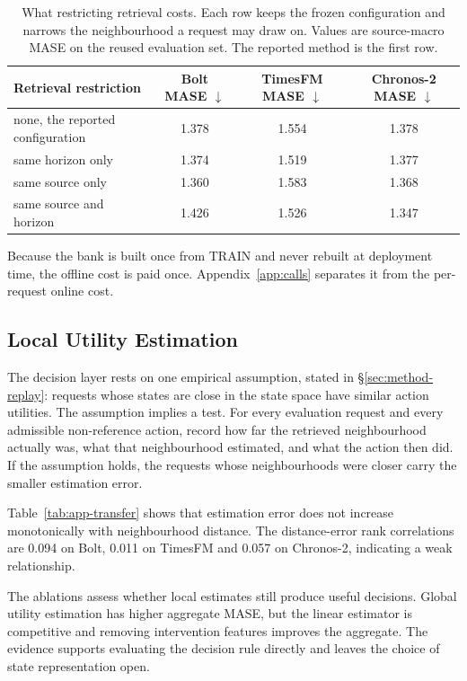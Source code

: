 \documentclass{article}
\begin{document}
\begin{table}[htbp]
  \caption{What restricting retrieval costs. Each row keeps the frozen configuration and
  narrows the neighbourhood a request may draw on. Values are source-macro MASE on the
  reused evaluation set. The reported method is the first row.}
  \label{tab:app-retrieval}
  \centering
  \small
  \setlength{\tabcolsep}{4pt}
\begin{tabular}{lccc}
    \toprule
    Retrieval restriction & Bolt MASE $\downarrow$ & TimesFM MASE $\downarrow$ & Chronos-2 MASE $\downarrow$ \\
    \midrule
    none, the reported configuration & 1.378 & 1.554 & 1.378 \\
    same horizon only                & 1.374   & 1.519   & 1.377 \\
    same source only                 & 1.360  & 1.583  & 1.368 \\
    same source and horizon          & 1.426 & 1.526 & 1.347 \\
    \bottomrule
  \end{tabular}
\end{table}
Because the bank is built once from TRAIN and never rebuilt at deployment time, the offline
cost is paid once. Appendix~\ref{app:calls} separates it from the per-request online cost.

\subsection{Local Utility Estimation}
\label{app:transfer}
The decision layer rests on one empirical assumption, stated in \S\ref{sec:method-replay}:
requests whose states are close in the state space have similar action utilities. The
assumption implies a test. For every evaluation request and every admissible non-reference
action, record how far the retrieved neighbourhood actually was, what that neighbourhood
estimated, and what the action then did. If the assumption holds, the requests whose
neighbourhoods were closer carry the smaller estimation error.

Table~\ref{tab:app-transfer} shows that estimation error does not increase monotonically
with neighbourhood distance. The distance-error rank correlations
are 0.094 on Bolt, 0.011 on TimesFM and 0.057 on Chronos-2, indicating a weak relationship.

The ablations assess whether local estimates still produce useful decisions.
Global utility estimation has higher aggregate MASE, but the linear estimator is competitive
and removing intervention features improves the aggregate. The evidence supports evaluating
the decision rule directly and leaves the choice of state representation open.
\end{document}
